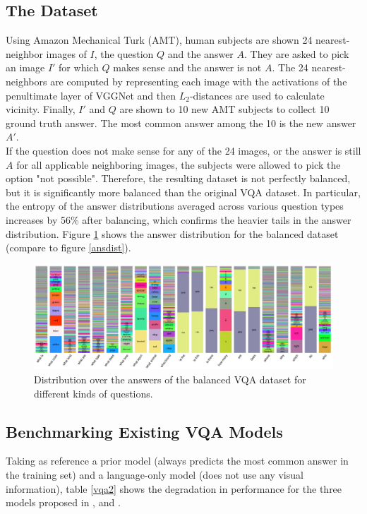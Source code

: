 \documentclass{article}
\begin{document}
\subsection{The Dataset}
Using Amazon Mechanical Turk (AMT), human subjects are shown 24 nearest-neighbor images of $I$, the question $Q$ and the answer $A$. They are asked to pick an image $I'$ for which $Q$ makes sense and the answer is not $A$. The 24 nearest-neighbors are computed by representing each image with the activations of the penultimate layer of VGGNet and then $L_2$-distances are used to calculate vicinity. Finally, $I'$ and $Q$ are shown to 10 new AMT subjects to collect 10 ground truth answer. The most common answer among the 10 is the new answer $A'$.\\
If the question does not make sense for any of the 24 images, or the answer is still $A$ for all applicable neighboring images, the subjects were allowed to pick the option "not possible". Therefore, the resulting dataset is not perfectly balanced, but it is significantly more balanced than the original VQA dataset. In particular, the entropy of the answer distributions averaged across various question types increases by 56\% after balancing, which confirms the heavier tails in the answer distribution. Figure \ref{balancedAns} shows the answer distribution for the balanced dataset (compare to figure \ref{ansdist}). 

    \begin{figure}[ht]
    	\centering
            \includegraphics[width=1.0\linewidth]{balancedAns.PNG}
        \caption{Distribution over the answers of the balanced VQA dataset for different kinds of questions.}
    	\label{balancedAns}
    \end{figure}

\subsection{Benchmarking Existing VQA Models}
Taking as reference a prior model (always predicts the most common answer in the training set) and a language-only model (does not use any visual information), table \ref{vqa2} shows the degradation in performance for the three models proposed in \citep{iccvAntol15}, \citep{nipsLu16} and \citep{corrFukui16}.
\end{document}
